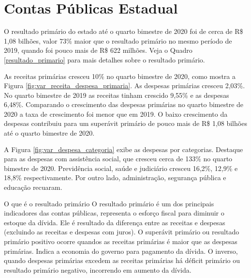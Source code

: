 \hypertarget{contas-puxfablicas-estadual}{%
\chapter{Contas Públicas Estadual}\label{contas-puxfablicas-estadual}}

O resultado primário do estado até o quarto bimestre de 2020 foi de
cerca de R\$ 1,08 bilhões, valor 73\% maior que o resultado primário no
mesmo período de 2019, quando foi pouco mais de R\$ 622 milhões. Veja o
Quadro \ref{resultado_primario} para mais detalhes sobre o resultado
primário.

As receitas primárias cresceu 10\% no quarto bimestre de 2020, como
mostra a Figura \ref{fig:var_receita_despesa_primaria}. As despesas
primárias cresceu 2,03\%. No quarto bimestre de 2019 as receitas tinham
crescido 9,55\% e as despesas 6,48\%. Comparando o crescimento das
despesas primárias no quarto bimestre de 2020 a taxa de crescimento foi
menor que em 2019. O baixo crescimento da despesas contribuiu para um
superávit primário de pouco mais de R\$ 1,08 bilhões até o quarto
bimestre de 2020.

A Figura \ref{fig:var_despesa_categoria} exibe as despesas por
categorias. Destaque para as despesas com assistência social, que
cresceu cerca de 133\% no quarto bimestre de 2020. Previdência social,
saúde e judiciário cresceu 16,2\%, 12,9\% e 18,8\% respectivamente. Por
outro lado, administração, segurança pública e educação recuaram.

\begin{smbox}[label={resultado_primario}, nameref={O que é o resultado primário}]{O que é o resultado primário}
O resultado primário é um dos principais indicadores das contas públicas, representa o esforço fiscal para diminuir o estoque da dívida. Ele é resultado da diferença entre as receitas e despesas (excluindo as receitas e despesas com juros). O superávit primário ou resultado primário positivo ocorre quandos as receitas primárias é maior que as despesas primárias. Indica a economia do governo para pagamento da dívida. O inverso, quando despesas primárias excedem as receitas primárias há déficit primário ou resultado primário negativo, incorrendo em aumento da dívida.
\end{smbox}

